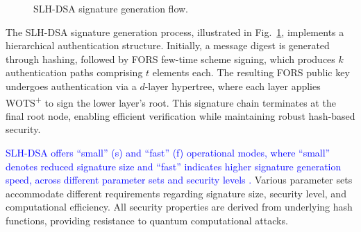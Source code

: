 \documentclass[journal]{IEEEtran}
\begin{document}
\begin{figure}[t]
  \centering
  \caption{SLH-DSA signature generation flow.}
  \label{fig:sphincs-process}
\end{figure}

The SLH-DSA signature generation process, illustrated in Fig.~\ref{fig:sphincs-process}, implements a hierarchical authentication structure. Initially, a message digest is generated through hashing, followed by FORS few-time scheme signing, which produces $k$ authentication paths comprising $t$ elements each. The resulting FORS public key undergoes authentication via a $d$-layer hypertree, where each layer applies WOTS\textsuperscript{+} to sign the lower layer's root. This signature chain terminates at the final root node, enabling efficient verification while maintaining robust hash-based security.

\textcolor{blue}{SLH-DSA offers ``small'' (s) and ``fast'' (f) operational modes, where ``small'' denotes reduced signature size and ``fast'' indicates higher signature generation speed, across different parameter sets and security levels \cite{Barker}. }
Various parameter sets accommodate different requirements regarding signature size, security level, and computational efficiency. All security properties are derived from underlying hash functions, providing resistance to quantum computational attacks.
\end{document}
